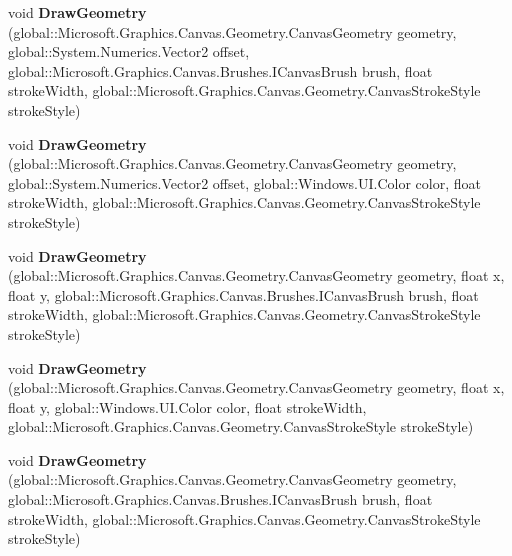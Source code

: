 \begin{DoxyCompactItemize}
void {\bfseries Draw\+Geometry} (global\+::\+Microsoft.\+Graphics.\+Canvas.\+Geometry.\+Canvas\+Geometry geometry, global\+::\+System.\+Numerics.\+Vector2 offset, global\+::\+Microsoft.\+Graphics.\+Canvas.\+Brushes.\+I\+Canvas\+Brush brush, float stroke\+Width, global\+::\+Microsoft.\+Graphics.\+Canvas.\+Geometry.\+Canvas\+Stroke\+Style stroke\+Style)
\item 
\mbox{\label{interface_microsoft_1_1_graphics_1_1_canvas_1_1_i_canvas_drawing_session_a274e3b45ea98448ed581f7fcf2fa9851}} 
void {\bfseries Draw\+Geometry} (global\+::\+Microsoft.\+Graphics.\+Canvas.\+Geometry.\+Canvas\+Geometry geometry, global\+::\+System.\+Numerics.\+Vector2 offset, global\+::\+Windows.\+U\+I.\+Color color, float stroke\+Width, global\+::\+Microsoft.\+Graphics.\+Canvas.\+Geometry.\+Canvas\+Stroke\+Style stroke\+Style)
\item 
\mbox{\label{interface_microsoft_1_1_graphics_1_1_canvas_1_1_i_canvas_drawing_session_a2d6f496d3fb2a489d20c6106ae84ed80}} 
void {\bfseries Draw\+Geometry} (global\+::\+Microsoft.\+Graphics.\+Canvas.\+Geometry.\+Canvas\+Geometry geometry, float x, float y, global\+::\+Microsoft.\+Graphics.\+Canvas.\+Brushes.\+I\+Canvas\+Brush brush, float stroke\+Width, global\+::\+Microsoft.\+Graphics.\+Canvas.\+Geometry.\+Canvas\+Stroke\+Style stroke\+Style)
\item 
\mbox{\label{interface_microsoft_1_1_graphics_1_1_canvas_1_1_i_canvas_drawing_session_aed38218a3653ea2b24aec25fb513c08d}} 
void {\bfseries Draw\+Geometry} (global\+::\+Microsoft.\+Graphics.\+Canvas.\+Geometry.\+Canvas\+Geometry geometry, float x, float y, global\+::\+Windows.\+U\+I.\+Color color, float stroke\+Width, global\+::\+Microsoft.\+Graphics.\+Canvas.\+Geometry.\+Canvas\+Stroke\+Style stroke\+Style)
\item 
\mbox{\label{interface_microsoft_1_1_graphics_1_1_canvas_1_1_i_canvas_drawing_session_a94bae7d96a11bff1dc144fcec27ff249}} 
void {\bfseries Draw\+Geometry} (global\+::\+Microsoft.\+Graphics.\+Canvas.\+Geometry.\+Canvas\+Geometry geometry, global\+::\+Microsoft.\+Graphics.\+Canvas.\+Brushes.\+I\+Canvas\+Brush brush, float stroke\+Width, global\+::\+Microsoft.\+Graphics.\+Canvas.\+Geometry.\+Canvas\+Stroke\+Style stroke\+Style)

\end{DoxyCompactItemize}
